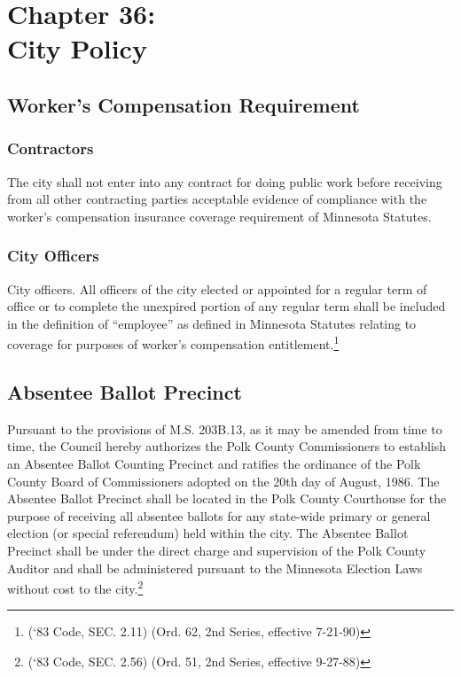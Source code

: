 \chapter*{Chapter 36: \\
	City Policy}
    \minitoc
    \pagebreak
    
\section{Worker's Compensation Requirement}
\subsection{Contractors}
The city shall not enter into any contract for doing public work before receiving from all other contracting parties acceptable evidence of compliance with the worker’s compensation insurance coverage requirement of Minnesota Statutes.
\subsection{City Officers}
City officers.  All officers of the city elected or appointed for a regular term of office or to complete the unexpired portion of any regular term shall be included in the definition of “employee” as defined in Minnesota Statutes relating to coverage for purposes of worker’s compensation entitlement.\footnote{(‘83 Code, SEC. 2.11)  (Ord. 62, 2nd Series, effective 7-21-90)}

\section{Absentee Ballot Precinct}
Pursuant to the provisions of M.S. \textsection 203B.13, as it may be amended from time to time, the Council hereby authorizes the Polk County Commissioners to establish an Absentee Ballot Counting Precinct and ratifies the ordinance of the Polk County Board of Commissioners adopted on the 20th day of August, 1986.  The Absentee Ballot Precinct shall be located in the Polk County Courthouse for the purpose of receiving all absentee ballots for any state-wide primary or general election (or special referendum) held within the city.  The Absentee Ballot Precinct shall be under the direct charge and supervision of the Polk County Auditor and shall be administered pursuant to the Minnesota Election Laws without cost to the city.\footnote{(‘83 Code, SEC. 2.56)  (Ord. 51, 2nd Series, effective 9-27-88)}

